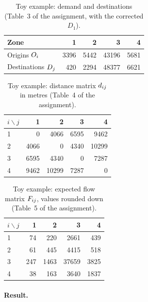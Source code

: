 \begin{table}[H]
  \centering
  \caption{Toy example: demand and destinations (Table~3 of the assignment, with the corrected $D_1$).}
  \label{tab:toy-inputs}
  \begin{tabular}{@{}lrrrr@{}}
    \toprule
    Zone & 1 & 2 & 3 & 4 \\
    \midrule
    Origins $O_i$      & 3396 & 5442 & 43196 & 5681 \\
    Destinations $D_j$ & 420  & 2294 & 48377 & 6621 \\
    \bottomrule
  \end{tabular}
\end{table}

\begin{table}[H]
  \centering
  \caption{Toy example: distance matrix $d_{ij}$ in metres (Table~4 of the assignment).}
  \label{tab:toy-distance}
  \begin{tabular}{@{}lrrrr@{}}
    \toprule
    $i \backslash j$ & 1 & 2 & 3 & 4 \\
    \midrule
    1 & 0     & 4066  & 6595 & 9462  \\
    2 & 4066  & 0     & 4340 & 10299 \\
    3 & 6595  & 4340  & 0    & 7287  \\
    4 & 9462  & 10299 & 7287 & 0     \\
    \bottomrule
  \end{tabular}
\end{table}

\begin{table}[H]
  \centering
  \caption{Toy example: expected flow matrix $F_{ij}$, values rounded down (Table~5 of the assignment).}
  \label{tab:toy-flows}
  \begin{tabular}{@{}lrrrr@{}}
    \toprule
    $i \backslash j$ & 1 & 2 & 3 & 4 \\
    \midrule
    1 & 74  & 220  & 2661  & 439  \\
    2 & 61  & 445  & 4415  & 518  \\
    3 & 247 & 1463 & 37659 & 3825 \\
    4 & 38  & 163  & 3640  & 1837 \\
    \bottomrule
  \end{tabular}
\end{table}

\paragraph{Result.}

